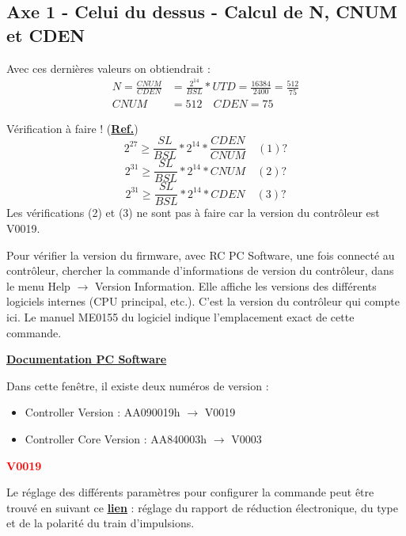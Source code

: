 \documentclass[a4paper,11pt]{beamer}
\begin{document}
\subsection{Axe 1 - Celui du dessus - Calcul de N, CNUM et CDEN}
\begin{frame}
\justifying
Avec ces dernières valeurs on obtiendrait :
\begin{align*}
N = \frac{CNUM}{CDEN} &= \frac{2^{14}}{BSL}*UTD = \frac{16384}{2400} = \frac{512}{75} \\
CNUM &= 512 \quad CDEN = 75
\end{align*}
\begin{alertblock}{Vérification à faire ! (\textcolor{white}{\textbf{\underline{\href{https://raw.githubusercontent.com/fbuloup/Interface_IAI/main/Documentation/SCON-CB_CGB(ME0340-8A).pdf\#page=258}{Ref.}}}})}
$$
2^{27} \geq \frac{SL}{BSL} * 2^{14} * \frac{CDEN}{CNUM}\quad (1)?
$$
$$
2^{31} \geq \frac{SL}{BSL} * 2^{14} * CNUM\quad (2)?
$$
$$
2^{31} \geq \frac{SL}{BSL} * 2^{14} * CDEN\quad (3)?
$$
Les vérifications (2) et (3) ne sont pas à faire car la version du contrôleur est V0019.
\end{alertblock}
\end{frame}

\begin{frame}
\justifying
Pour vérifier la version du firmware, avec RC PC Software, une fois connecté au contrôleur, chercher la commande d'informations de version du contrôleur, dans le menu Help $\rightarrow$ Version Information. Elle affiche les versions des différents logiciels internes (CPU principal, etc.). C'est la version du contrôleur qui compte ici. Le manuel ME0155 du logiciel indique l'emplacement exact de cette commande.

\centering \textcolor{blue}{\textbf{\underline{\href{https://raw.githubusercontent.com/fbuloup/Interface_IAI/main/Documentation/RCM-101-MW_USB(ME0155-31A).pdf\#page=203}{Documentation PC Software}}}}	
\vspace{0.25cm}

\centering 
Dans cette fenêtre, il existe deux numéros de version :
\begin{itemize}
	\item Controller Version : AA090019h $\rightarrow$ V0019
	\item Controller Core Version : AA840003h $\rightarrow$ V0003
\end{itemize}
\textcolor{red}{\textbf{V0019}}	

\justifying	
Le réglage des différents paramètres pour configurer la commande peut être trouvé en suivant ce 
\textcolor{blue}{\textbf{\underline{\href{https://raw.githubusercontent.com/fbuloup/Interface_IAI/main/Documentation/SCON-CB_CGB(ME0340-8A).pdf\#page=257}{lien}}}} : réglage du rapport de réduction électronique, du type et de la polarité du train d'impulsions.
\end{frame}
\end{document}
